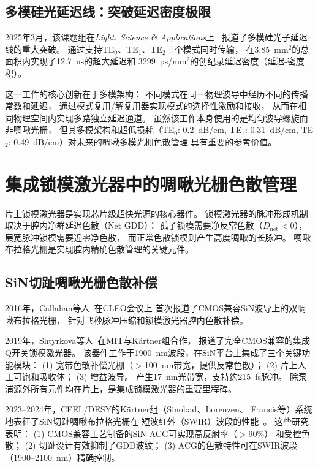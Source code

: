 \documentclass[12pt,a4paper,twoside]{article}
\begin{document}
\subsection{多模硅光延迟线：突破延迟密度极限}

2025年3月，该课题组在\textit{Light: Science \& Applications}上~\cite{hong2025}
报道了多模硅光子延迟线的重大突破。
通过支持TE$_0$、TE$_1$、TE$_2$三个模式同时传输，
在3.85~mm$^2$的总面积内实现了12.7~ns的超大延迟和
3299~ps/mm$^2$的创纪录延迟密度（延迟-密度积）。

这一工作的核心创新在于多模架构：
不同模式在同一物理波导中经历不同的传播常数和延迟，
通过模式复用/解复用器实现模式的选择性激励和接收，
从而在相同物理空间内实现多路独立延迟通道。
虽然该工作本身使用的是均匀波导螺旋而非啁啾光栅，
但其多模架构和超低损耗（TE$_0$: 0.2~dB/cm, TE$_1$: 0.31~dB/cm,
TE$_2$: 0.49~dB/cm）对未来的啁啾多模光栅色散管理
具有重要的参考价值。

\newpage

\section{集成锁模激光器中的啁啾光栅色散管理}

片上锁模激光器是实现芯片级超快光源的核心器件。
锁模激光器的脉冲形成机制取决于腔内净群延迟色散（Net GDD）：
孤子锁模需要净反常色散（$D_{\text{net}} < 0$），
展宽脉冲锁模需要近零净色散，
而正常色散锁模则产生高度啁啾的长脉冲。
啁啾布拉格光栅是实现腔内精确色散管理的关键元件。

\subsection{SiN切趾啁啾光栅色散补偿}

2016年，Callahan等人~\cite{callahan2016}在CLEO会议上
首次报道了CMOS兼容SiN波导上的双啁啾布拉格光栅，
针对飞秒脉冲压缩和锁模激光器腔内色散补偿。

2019年，Shtyrkova等人~\cite{shtyrkova2019}在MIT与K\"{a}rtner组合作，
报道了完全CMOS兼容的集成Q开关锁模激光器。
该器件工作于1900~nm波段，在SiN平台上集成了三个关键功能模块：
(1) 宽带色散补偿光栅（$>$100~nm带宽，提供反常色散）；
(2) 片上人工可饱和吸收体；
(3) 增益波导。
产生17~nm光带宽，支持约215~fs脉冲。
除泵浦源外所有元件均在片上，是集成锁模激光器的重要里程碑。

2023--2024年，CFEL/DESY的K\"{a}rtner组（Sinobad、Lorenzen、
Francis等）系统地表征了SiN切趾啁啾布拉格光栅在
短波红外（SWIR）波段的性能~\cite{sinobad2023cleo,sinobad2023cleoeu}。
这些研究表明：
(1) CMOS兼容工艺制备的SiN ACG可实现高反射率（$>$90\%）
和受控色散；
(2) 切趾设计有效抑制了GDD波纹；
(3) ACG的色散特性可在SWIR波段（1900--2100~nm）精确控制。
\end{document}
